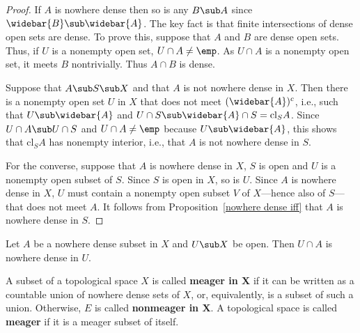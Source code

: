 \begin{proof}
If $A$ is nowhere dense then so is any $B\sub A$ since $\widebar{B}\sub\widebar{A}$. The key fact is that finite intersections of dense open sets are dense. To prove this, suppose that $A$ and $B$ are dense open sets. Thus, if $U$ is a nonempty open set, $U\cap A\neq\emp$. As $U\cap A$ is a nonempty open set, it meets $B$ nontrivially. Thus $A\cap B$ is dense.\par
Suppose that $A\sub S\sub X$ and that $A$ is not nowhere dense in $X$. Then there is a nonempty open set $U$ in $X$ that does not meet $(\widebar{A})^c$, i.e., such that $U\sub\widebar{A}$ and $U\cap S\sub\widebar{A}\cap S=\mathrm{cl}_SA$. Since $U\cap A\sub U\cap S$ and $U\cap A\neq\emp$ because $U\sub\widebar{A}$, this shows that $\mathrm{cl}_SA$ has nonempty interior, i.e., that $A$ is not nowhere dense in $S$.\par
For the converse, suppose that $A$ is nowhere dense in $X$, $S$ is open and $U$ is a nonempty open subset of $S$. Since $S$ is open in $X$, so is $U$. Since $A$ is nowhere dense in $X$, $U$ must contain a nonempty open subset $V$ of $X$---hence also of $S$---that does not meet $A$. It follows from Proposition~\ref{nowhere dense iff} that $A$ is nowhere dense in $S$.
\end{proof}
\begin{corollary}\label{nowhere dense hereditary to open set}
Let $A$ be a nowhere dense subset in $X$ and $U\sub X$ be open. Then $U\cap A$ is nowhere dense in $U$. 
\end{corollary}
\begin{definition}
A subset of a topological space $X$ is called \textbf{meager in $\bm{X}$} if it can be written as a countable union of nowhere dense sets of $X$, or, equivalently, is a subset of such a union. Otherwise, $E$ is called \textbf{nonmeager in $\bm{X}$}. A topological space is called \textbf{meager} if it is a meager subset of itself.
\end{definition}

